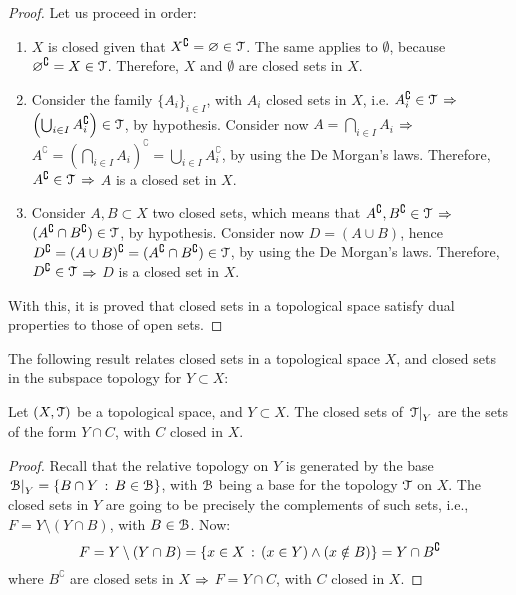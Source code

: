 \begin{proof}
	Let us proceed in order:
	\begin{enumerate}
		\item $X$ is closed given that $X^\complement=\varnothing\in \EuScript{T}$. The same applies to $\emptyset$, because $\varnothing^\complement=X\in \EuScript{T}$.
		Therefore, $X$ and $\emptyset$ are closed sets in $X$.
		\item Consider the family $\{A_i\}_{i\in I}$, with $A_i$ closed sets in $X$, i.e. $A_i^\complement\in \EuScript{T}$ $\Rightarrow$ $\left(\bigcup_{i\in I}A_i^\complement\right)\in \EuScript{T}$, by hypothesis. Consider now $A=\bigcap_{i\in I}A_i$ $\Rightarrow$ $A^\complement = \left(\bigcap_{i\in I} A_i \right)^\complement=\bigcup_{i\in I}A_i^\complement$, by using the De Morgan's laws. Therefore, $A^\complement\in \EuScript{T}$ $\Rightarrow$ $A$ is a closed set in $X$.
		\item Consider $A,B\subset X$ two closed sets, which means that $A^\complement, B^\complement\in \EuScript{T}$ $\Rightarrow$ $(A^\complement\cap B^\complement)\in \EuScript{T}$, by hypothesis. Consider now $D=(A\cup B)$, hence $D^\complement = (A\cup B)^\complement = (A^\complement \cap B^\complement)\in \EuScript{T}$, by using the De Morgan's laws. Therefore, $D^\complement\in \EuScript{T}$ $\Rightarrow$ $D$ is a closed set in $X$.
	\end{enumerate}
	With this, it is proved that closed sets in a topological space satisfy dual properties to those of open sets.
\end{proof}

The following result relates closed sets in a topological space $X$, and closed sets in the subspace topology for $Y\subset X$:

\begin{lemma}
	\label{lem:closed-sets-subspace-topology}
	Let $(X, \EuScript{T})$ be a topological space, and $Y\subset X$. The closed sets of $\left.\EuScript{T}\right|_{Y}$ are the sets of the form $Y\cap C$, with $C$ closed in $X$.
\end{lemma}
\begin{proof}
	Recall that the relative topology on $Y$ is generated by the base $\left.\EuScript{B}\right|_{Y}=\left\{B\cap Y\,:\,B\in\EuScript{B}\right\}$, with $\EuScript{B}$ being a base for the topology $\EuScript{T}$ on $X$. The closed sets in $Y$ are going to be precisely the complements of such sets, i.e., $F=Y\setminus(Y\cap B)$, with $B\in\EuScript{B}$. Now:
	$$
	F=Y\setminus(Y\cap B)=\left\{x\in X\,:\,(x\in Y)\land(x\notin B)\right\}=Y\cap B^\complement
	$$
	where $B^\complement$ are closed sets in $X$ $\Rightarrow$ $F=Y\cap C$, with $C$ closed in $X$.
\end{proof}

